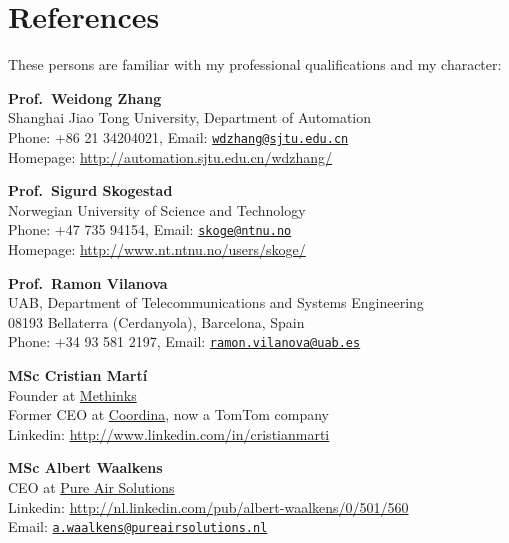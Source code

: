 \documentclass[a4paper]{article}
\begin{document}
\section{References}\label{references}

These persons are familiar with my professional qualifications and my
character:

\textbf{Prof.~Weidong Zhang}\\
Shanghai Jiao Tong University, Department of Automation\\
Phone: +86 21 34204021, Email:
\href{mailto:wdzhang@sjtu.edu.cn}{\nolinkurl{wdzhang@sjtu.edu.cn}}\\
Homepage: \url{http://automation.sjtu.edu.cn/wdzhang/}

\textbf{Prof.~Sigurd Skogestad}\\
Norwegian University of Science and Technology\\
Phone: +47 735 94154, Email:
\href{mailto:skoge@ntnu.no}{\nolinkurl{skoge@ntnu.no}}\\
Homepage: \url{http://www.nt.ntnu.no/users/skoge/}

\textbf{Prof.~Ramon Vilanova}\\
UAB, Department of Telecommunications and Systems Engineering\\
08193 Bellaterra (Cerdanyola), Barcelona, Spain\\
Phone: +34 93 581 2197, Email:
\href{mailto:ramon.vilanova@uab.es}{\nolinkurl{ramon.vilanova@uab.es}}

\textbf{MSc Cristian Martí}\\
Founder at \href{http://methinks.es/}{Methinks}\\
Former CEO at \href{www.coordina.com}{Coordina}, now a TomTom company\\
Linkedin: \url{http://www.linkedin.com/in/cristianmarti}

\textbf{MSc Albert Waalkens}\\
CEO at \href{www.pureairsolutions.nl}{Pure Air Solutions}\\
Linkedin: \url{http://nl.linkedin.com/pub/albert-waalkens/0/501/560}\\
Email:
\href{mailto:a.waalkens@pureairsolutions.nl}{\nolinkurl{a.waalkens@pureairsolutions.nl}}
\end{document}
